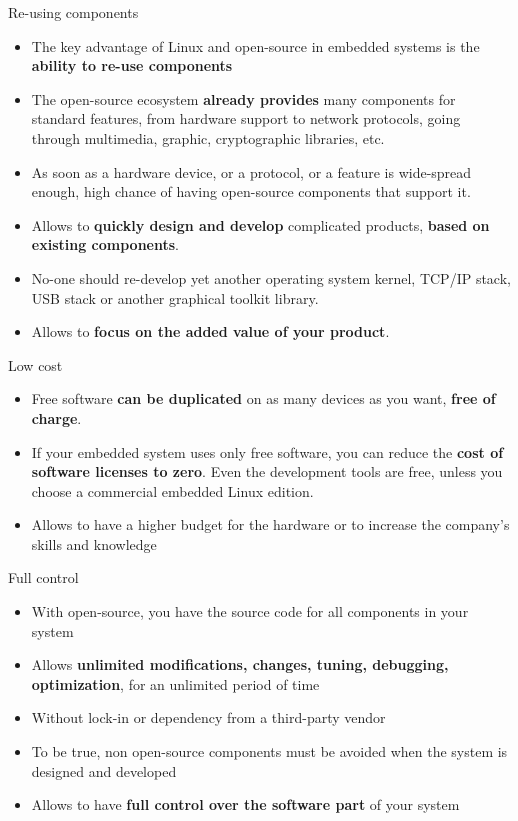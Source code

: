 \begin{frame}{Re-using components}
    \begin{itemize}
        \item  The key advantage of Linux and open-source in embedded
systems is the \textbf{ability to re-use components}
\item The open-source ecosystem \textbf{already provides} many
components for standard features, from hardware support to
network protocols, going through multimedia, graphic,
cryptographic libraries, etc.
\item As soon as a hardware device, or a protocol, or a feature is
wide-spread enough, high chance of having open-source
components that support it.
\item Allows to \textbf{quickly design and develop} complicated products,
\textbf{based on existing components}.
\item No-one should re-develop yet another operating system kernel,
TCP/IP stack, USB stack or another graphical toolkit library.
\item Allows to \textbf{focus on the added value of your product}.
    \end{itemize}    
\end{frame}


\begin{frame}{Low cost}
    \begin{itemize}
        \item Free software \textbf{can be duplicated} on as many devices as you
want, \textbf{free of charge}.
\item If your embedded system uses only free software, you can
reduce the \textbf{cost of software licenses to zero}. Even the
development tools are free, unless you choose a commercial
embedded Linux edition.
\item Allows to have a higher budget for the hardware or to
increase the company’s skills and knowledge
    \end{itemize}    
\end{frame}


\begin{frame}{Full control}
    \begin{itemize}
        \item With open-source, you have the source code for all
components in your system
\item Allows \textbf{unlimited modifications, changes, tuning, debugging,
optimization}, for an unlimited period of time
\item Without lock-in or dependency from a third-party vendor
\item To be true, non open-source components must be avoided
when the system is designed and developed
\item Allows to have \textbf{full control over the software part} of your
system
    \end{itemize}    
\end{frame}


